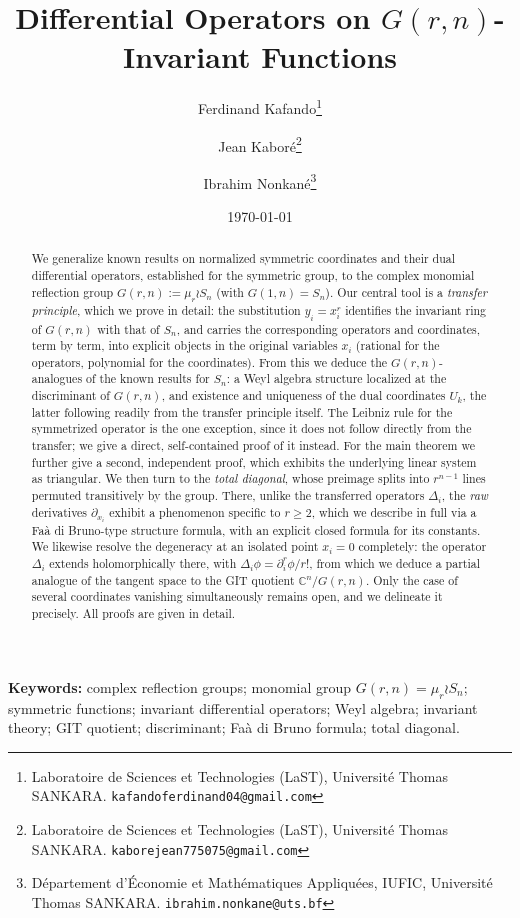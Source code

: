 \documentclass[11pt]{article}
\title{Differential Operators on $G(r,n)$-Invariant Functions}
\author{Ferdinand Kafando\thanks{Laboratoire de Sciences et Technologies (LaST), Université Thomas SANKARA. \texttt{kafandoferdinand04@gmail.com}} \and Jean Kaboré\thanks{Laboratoire de Sciences et Technologies (LaST), Université Thomas SANKARA. \texttt{kaborejean775075@gmail.com}} \and Ibrahim Nonkané\thanks{Département d'Économie et Mathématiques Appliquées, IUFIC, Université Thomas SANKARA. \texttt{ibrahim.nonkane@uts.bf}}}
\date{\today}
\theoremstyle{remark}
\newcommand{\CC}{\mathbb{C}}
\begin{document}
\maketitle
\tableofcontents

\begin{abstract}
We generalize known results on normalized symmetric coordinates and their dual differential operators, established for the symmetric group, to the complex monomial reflection group $G(r,n):=\mu_r\wr S_n$ (with $G(1,n)=S_n$). Our central tool is a \emph{transfer principle}, which we prove in detail: the substitution $y_i=x_i^r$ identifies the invariant ring of $G(r,n)$ with that of $S_n$, and carries the corresponding operators and coordinates, term by term, into explicit objects in the original variables $x_i$ (rational for the operators, polynomial for the coordinates). From this we deduce the $G(r,n)$-analogues of the known results for $S_n$: a Weyl algebra structure localized at the discriminant of $G(r,n)$, and existence and uniqueness of the dual coordinates $U_k$, the latter following readily from the transfer principle itself. The Leibniz rule for the symmetrized operator is the one exception, since it does not follow directly from the transfer; we give a direct, self-contained proof of it instead. For the main theorem we further give a second, independent proof, which exhibits the underlying linear system as triangular. We then turn to the \emph{total diagonal}, whose preimage splits into $r^{n-1}$ lines permuted transitively by the group. There, unlike the transferred operators $\Delta_i$, the \emph{raw} derivatives $\partial_{x_i}$ exhibit a phenomenon specific to $r\ge2$, which we describe in full via a Faà di Bruno-type structure formula, with an explicit closed formula for its constants. We likewise resolve the degeneracy at an isolated point $x_i=0$ completely: the operator $\Delta_i$ extends holomorphically there, with $\Delta_i\phi=\partial_{i}^r\phi /r!$, from which we deduce a partial analogue of the tangent space to the GIT quotient $\CC^n/G(r,n)$. Only the case of several coordinates vanishing simultaneously remains open, and we delineate it precisely. All proofs are given in detail.
\end{abstract}

\noindent\textbf{Keywords:} complex reflection groups; monomial group $G(r,n)=\mu_r\wr S_n$; symmetric functions; invariant differential operators; Weyl algebra; invariant theory; GIT quotient; discriminant; Faà di Bruno formula; total diagonal.
\end{document}
